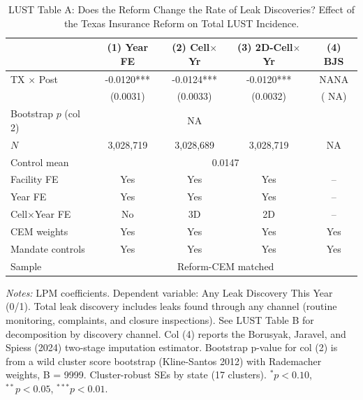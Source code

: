 \begin{table}[htbp]
\centering
\caption{LUST Table A: Does the Reform Change the Rate of Leak Discoveries? Effect of the Texas Insurance Reform on Total LUST Incidence.}
\label{tab:lust_a_total}
\begin{tabular}{lcccc}
\toprule
 & (1) Year FE & (2) Cell$\times$Yr & (3) 2D-Cell$\times$Yr & (4) BJS \\
\midrule
TX $\times$ Post & -0.0120*** & -0.0124*** & -0.0120*** &    NANA \\
                  & (0.0031) & (0.0033) & (0.0032) & (   NA) \\
Bootstrap $p$ (col 2) & &   NA & \multicolumn{2}{c}{} \\
$N$               & 3,028,719 & 3,028,689 & 3,028,719 & NA \\
Control mean      & \multicolumn{4}{c}{0.0147} \\
\midrule
Facility FE            & Yes & Yes & Yes & -- \\
Year FE                & Yes & Yes & Yes & -- \\
Cell$\times$Year FE   & No  & 3D  & 2D  & -- \\
CEM weights            & Yes & Yes & Yes & Yes \\
Mandate controls       & Yes & Yes & Yes & Yes \\
Sample & \multicolumn{4}{c}{Reform-CEM matched} \\
\bottomrule
\end{tabular}
\begin{minipage}{\linewidth}
\small
\textit{Notes:} LPM coefficients. Dependent variable: Any Leak Discovery This Year (0/1). Total leak discovery includes leaks found through any channel (routine monitoring, complaints, and closure inspections). See LUST Table B for decomposition by discovery channel. Col (4) reports the Borusyak, Jaravel, and Spiess (2024) two-stage imputation estimator. Bootstrap p-value for col (2) is from a wild cluster score bootstrap (Kline-Santos 2012) with Rademacher weights, B = 9999. Cluster-robust SEs by state (17 clusters). $^{*}p<0.10$, $^{**}p<0.05$, $^{***}p<0.01$.
\end{minipage}
\end{table}
